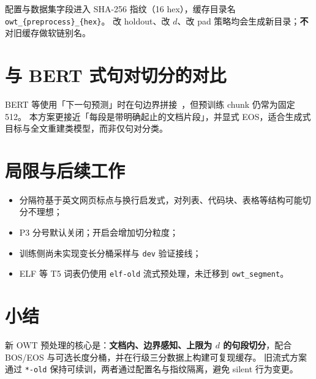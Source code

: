 \documentclass[UTF8,a4paper,11pt]{ctexart}
\begin{document}
配置与数据集字段进入 SHA-256 指纹（16 hex），缓存目录名 \texttt{owt\_\{preprocess\}\_\{hex\}}。
改 holdout、改 $d$、改 pad 策略均会生成新目录；\textbf{不}对旧缓存做软链别名。

\section{与 BERT 式句对切分的对比}

BERT 等使用「下一句预测」时在句边界拼接~\cite{devlin2019bert}，但预训练 chunk 仍常为固定 512。
本方案更接近「每段是带明确起止的文档片段」，并显式 EOS，适合生成式目标与全文重建类模型，而非仅句对分类。

\section{局限与后续工作}

\begin{itemize}
  \item 分隔符基于英文网页标点与换行启发式，对列表、代码块、表格等结构可能切分不理想；
  \item P3 分号默认关闭；开启会增加切分粒度；
  \item 训练侧尚未实现变长分桶采样与 \texttt{dev} 验证接线；
  \item ELF 等 T5 词表仍使用 \texttt{elf-old} 流式预处理，未迁移到 \texttt{owt\_segment}。
\end{itemize}

\section{小结}

新 OWT 预处理的核心是：\textbf{文档内、边界感知、上限为 $d$ 的句段切分}，配合 BOS/EOS 与可选长度分桶，并在行级三分数据上构建可复现缓存。
旧流式方案通过 \texttt{*-old} 保持可续训，两者通过配置名与指纹隔离，避免 silent 行为变更。

\printbibliography
\end{document}
